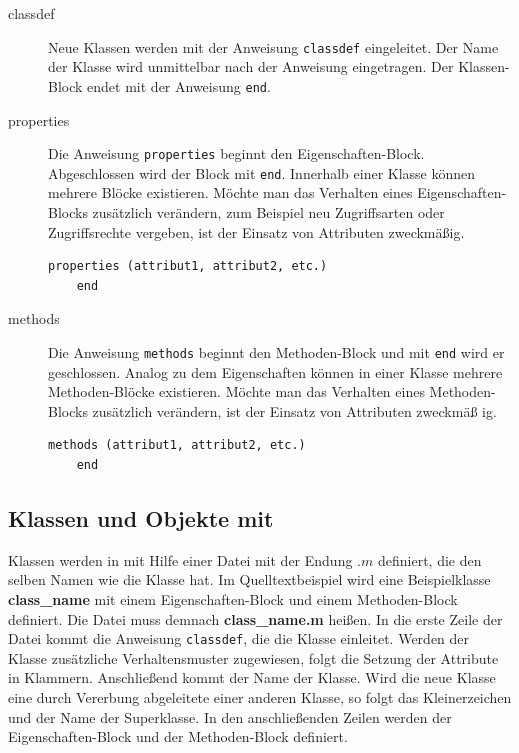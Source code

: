 \begin{description}

	\item[classdef] Neue Klassen werden mit der Anweisung
	\lstinline$classdef$ eingeleitet. Der Name der Klasse wird unmittelbar
	nach der Anweisung eingetragen. Der Klassen-Block endet mit der
	Anweisung \lstinline$end$.
	\item[properties] Die Anweisung \lstinline$properties$ beginnt den
	Eigenschaften-Block. Abgeschlossen wird der Block mit \lstinline$end$.
	Innerhalb einer Klasse k\"onnen mehrere Bl\"ocke existieren. M\"ochte
	man das Verhalten eines Eigenschaften-Blocks zus\"atzlich ver\"andern,
	zum Beispiel neu Zugriffsarten oder Zugriffsrechte vergeben, ist der
	Einsatz von Attributen zweckm\"a\ss ig.
	\begin{lstlisting}[frame=none]
	properties (attribut1, attribut2, etc.)
	end
	\end{lstlisting}
	\item[methods] Die Anweisung \lstinline$methods$ beginnt den
	Methoden-Block und mit \lstinline$end$ wird er geschlossen. Analog zu
	dem Eigenschaften k\"onnen in einer Klasse mehrere Methoden-Bl\"ocke
	existieren. M\"ochte man das Verhalten eines Methoden-Blocks
	zus\"atzlich ver\"andern, ist der Einsatz von Attributen zweckm\"a\ss
	ig.
	\begin{lstlisting}[frame=none]
	methods (attribut1, attribut2, etc.)
	end
	\end{lstlisting}


\end{description}


\subsection*{Klassen und Objekte mit \matlab}

Klassen werden in \matlab mit Hilfe einer Datei mit der Endung $.m$ definiert,
die den selben Namen wie die Klasse hat. Im Quelltextbeispiel
 wird eine Beispielklasse \textbf{class\_name} mit
einem Eigenschaften-Block und einem Methoden-Block definiert. Die Datei muss
demnach \textbf{class\_name.m} hei\ss en. In die erste Zeile der Datei kommt die
Anweisung \lstinline$classdef$, die die Klasse einleitet. Werden der Klasse
zus\"atzliche Verhaltensmuster zugewiesen, folgt die Setzung der Attribute in
Klammern. Anschlie\ss end kommt der Name der Klasse. Wird die neue Klasse eine
durch Vererbung abgeleitete einer anderen Klasse, so folgt das Kleinerzeichen
und der Name der Superklasse. In den anschlie\ss enden Zeilen werden der
Eigenschaften-Block und der Methoden-Block definiert.

